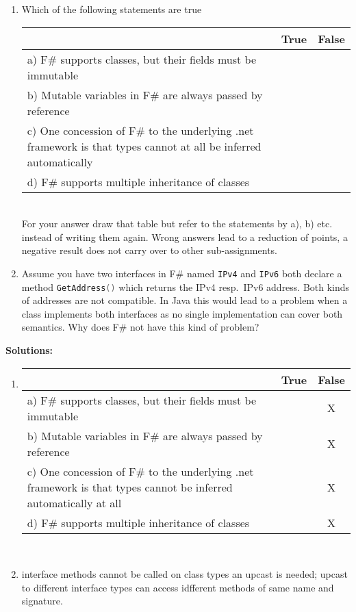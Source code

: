 \documentclass{article}
\newcommand{\solution}[1] {\textbf{Solutions:}\\ #1}
\newcommand{\comment}[1]{\marginpar{#1}}
\begin{document}
\begin{enumerate}
  \item \comment{\textbf{[2 points]}}Which of the following statements are true\\
    \begin{tabular}{|p{6cm}|c|c|}\hline
      & True & False \\ \hline
     a) F\# supports classes, but their fields must be immutable & & \\\hline
     b) Mutable variables in F\# are always passed by reference & & \\\hline
     c) One concession of F\#  to the underlying \textsf{.net}
     framework is that types cannot at all be inferred automatically & & \\\hline
     d) F\# supports multiple inheritance of classes & & \\\hline
   \end{tabular}\\
   For your answer draw that table but refer to the statements by a),
   b) etc. instead of writing them again. Wrong answers lead to a
   reduction of points, a negative result does not carry over to other
   sub-assignments. 
 \item \comment{\textbf{[1 point]}} Assume you have two interfaces in F\# named
   \lstinline[language=FSharp]{IPv4} and
   \lstinline[language=FSharp]{IPv6} both declare a method
   \lstinline[language=FSharp]{GetAddress()} which returns the IPv4
   resp.\ IPv6 address. Both kinds of addresses are not compatible. In
   Java this would lead to a problem when a class implements both
   interfaces as no single implementation can cover both
   semantics. Why does F\# not have this kind of problem?
\end{enumerate}

\solution{
\begin{enumerate}
\item 
    \begin{tabular}{|p{6cm}|c|c|}\hline
      & True & False \\ \hline
     a) F\# supports classes, but their fields must be immutable & & X \\\hline
     b) Mutable variables in F\# are always passed by reference & & X \\\hline
     c) One concession of F\#  to the underlying \textsf{.net}
     framework is that types cannot be inferred automatically at all &
     & X \\\hline
     d) F\# supports multiple inheritance of classes & & X\\\hline
   \end{tabular}\\
\item interface methods cannot be called on class types an upcast is
  needed; upcast to different interface types can access idfferent
  methods of same name and signature.
\end{enumerate}

}
\end{document}
